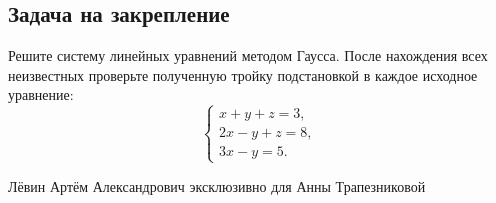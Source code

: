 \documentclass[12pt,a4paper]{article}
\begin{document}
\subsection*{Задача на закрепление}
Решите систему линейных уравнений методом Гаусса. После нахождения всех неизвестных проверьте полученную тройку подстановкой в каждое исходное уравнение:
\[
\begin{cases}
x+y+z=3,\\
2x-y+z=8,\\
3x-y=5.
\end{cases}
\]

\vspace{8mm}
\begin{center}
\small Лёвин Артём Александрович эксклюзивно для Анны Трапезниковой
\end{center}
\end{document}

